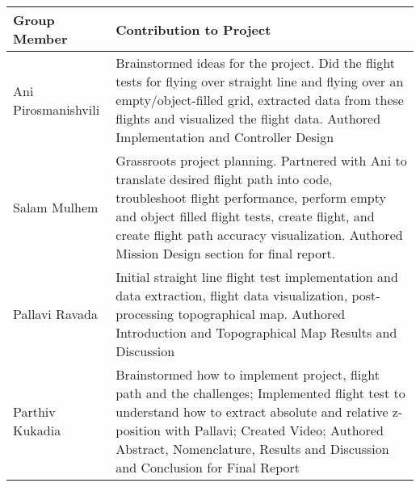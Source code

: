 {\renewcommand{\arraystretch}{1}%
 \begin{tabular}{|p{3cm} | p{12cm}|} 
 \hline
 Group Member & Contribution to Project \\ 
 \hline\hline
 Ani Pirosmanishvili &  Brainstormed ideas for the project. Did the flight tests for flying over straight line and flying over an empty/object-filled grid, extracted data from these flights and visualized the flight data. Authored Implementation and Controller Design \\ 
 \hline
 Salam Mulhem & Grassroots project planning. Partnered with Ani to translate desired flight path into code, troubleshoot flight performance, perform empty and object filled flight tests, create flight, and create flight path accuracy visualization. Authored Mission Design section for final report.  \\
 \hline
 Pallavi Ravada & Initial straight line flight test implementation and data extraction, flight data visualization, post-processing topographical map. Authored Introduction and Topographical Map Results and Discussion \\
 \hline
 Parthiv Kukadia & Brainstormed how to implement project, flight path and the challenges; Implemented flight test to understand how to extract absolute and relative z-position with Pallavi; Created Video; Authored Abstract, Nomenclature, Results and Discussion and Conclusion for Final Report \\
 \hline
\end{tabular}}
